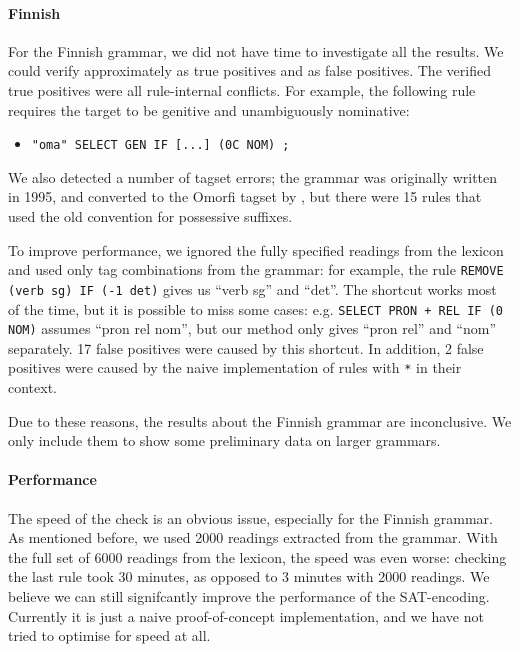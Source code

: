 \paragraph{Finnish}  For the Finnish grammar, we did not have time to investigate all the
results. We could verify approximately  as true positives and
 as false positives.
The verified true positives were all rule-internal conflicts. 
For example, the following rule requires the target to be genitive and unambiguously nominative: 
\begin{itemize}
\item[]\texttt{"oma" SELECT GEN IF [...] (0C NOM) ;}
\end{itemize}
We also detected a number of tagset errors;
the grammar was originally written in 1995, and converted to the
Omorfi tagset by \cite{pirinen2015}, but there were 15 rules that used the old convention for possessive suffixes.

To improve performance, we ignored the fully specified readings from the
lexicon and used only tag combinations from the grammar:
for example, the rule \texttt{REMOVE (verb sg) IF (-1 det)}
gives us ``verb sg'' and ``det''.
The shortcut works most of the time, but it is possible to
miss some cases: e.g. \texttt{SELECT PRON + REL IF (0 NOM)} 
assumes ``pron rel nom'', but our method only gives
``pron rel'' and ``nom'' separately. 
17 false positives were caused by this shortcut. 
In addition, 2 false positives were caused by the naive implementation of
rules with \verb!*! in their context.

Due to these reasons, the results about the Finnish grammar are
inconclusive. We only include them to show some preliminary data on larger grammars.

\paragraph{Performance} The speed of the check is an obvious issue,
especially for the Finnish grammar. 
As mentioned before, we used 2000 readings extracted from the grammar.
With the full set of 6000 readings from the lexicon, the speed
was even worse: checking the last rule took 30 minutes, as opposed to
3 minutes with 2000 readings. 
We believe we can still signifcantly improve the performance of the SAT-encoding. Currently it is just a naive proof-of-concept implementation, and we have not tried to optimise for speed at all.

